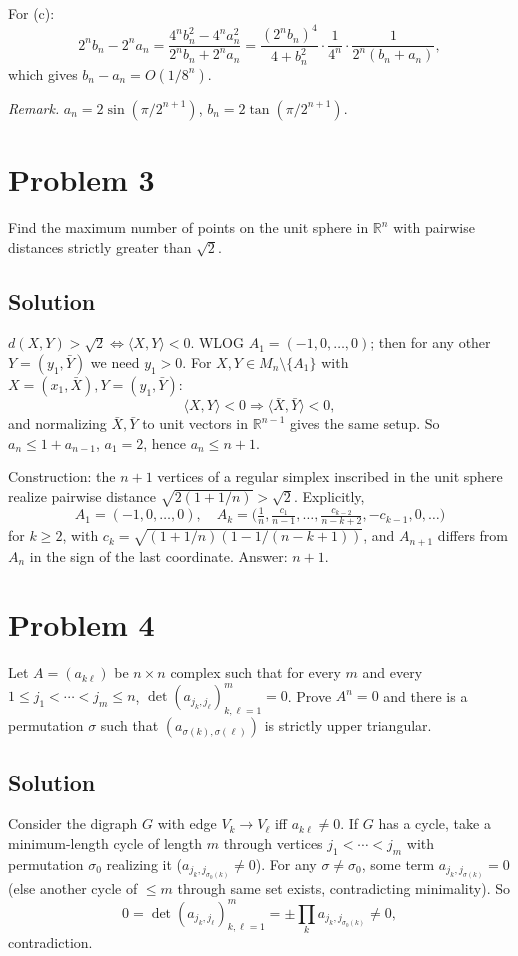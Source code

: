 \documentclass{article}
\begin{document}
For (c):
\[2^n b_n - 2^n a_n = \frac{4^n b_n^2 - 4^n a_n^2}{2^n b_n + 2^n a_n} = \frac{(2^n b_n)^4}{4+b_n^2}\cdot\frac{1}{4^n}\cdot\frac{1}{2^n(b_n+a_n)},\]
which gives $b_n - a_n = O(1/8^n)$.

\textit{Remark.} $a_n = 2\sin(\pi/2^{n+1})$, $b_n = 2\tan(\pi/2^{n+1})$.

\section*{Problem 3}
Find the maximum number of points on the unit sphere in $\mathbb{R}^n$ with pairwise distances strictly greater than $\sqrt{2}$.

\subsection*{Solution}
$d(X,Y)>\sqrt 2 \iff \langle X,Y\rangle < 0$. WLOG $A_1=(-1,0,\dots,0)$; then for any other $Y=(y_1,\bar Y)$ we need $y_1>0$. For $X,Y\in M_n\setminus\{A_1\}$ with $X=(x_1,\bar X), Y=(y_1,\bar Y)$:
\[\langle X,Y\rangle < 0 \Rightarrow \langle \bar X, \bar Y\rangle < 0,\]
and normalizing $\bar X, \bar Y$ to unit vectors in $\mathbb{R}^{n-1}$ gives the same setup. So $a_n \le 1 + a_{n-1}$, $a_1 = 2$, hence $a_n \le n+1$.

Construction: the $n+1$ vertices of a regular simplex inscribed in the unit sphere realize pairwise distance $\sqrt{2(1+1/n)} > \sqrt 2$. Explicitly,
\[A_1=(-1,0,\dots,0),\quad A_k=\big(\tfrac 1n, \tfrac{c_1}{n-1}, \dots, \tfrac{c_{k-2}}{n-k+2}, -c_{k-1}, 0, \dots\big)\]
for $k\ge 2$, with $c_k = \sqrt{(1+1/n)(1-1/(n-k+1))}$, and $A_{n+1}$ differs from $A_n$ in the sign of the last coordinate. Answer: $\boxed{n+1}$.

\section*{Problem 4}
Let $A=(a_{k\ell})$ be $n\times n$ complex such that for every $m$ and every $1\le j_1<\cdots<j_m\le n$, $\det(a_{j_k,j_\ell})_{k,\ell=1}^m = 0$. Prove $A^n = 0$ and there is a permutation $\sigma$ such that $(a_{\sigma(k),\sigma(\ell)})$ is strictly upper triangular.

\subsection*{Solution}
Consider the digraph $G$ with edge $V_k\to V_\ell$ iff $a_{k\ell}\ne 0$. If $G$ has a cycle, take a minimum-length cycle of length $m$ through vertices $j_1<\cdots<j_m$ with permutation $\sigma_0$ realizing it ($a_{j_k,j_{\sigma_0(k)}}\ne 0$). For any $\sigma\ne\sigma_0$, some term $a_{j_k,j_{\sigma(k)}}=0$ (else another cycle of $\le m$ through same set exists, contradicting minimality). So
\[0 = \det(a_{j_k,j_\ell})_{k,\ell=1}^m = \pm\prod_k a_{j_k,j_{\sigma_0(k)}} \ne 0,\]
contradiction.
\end{document}
